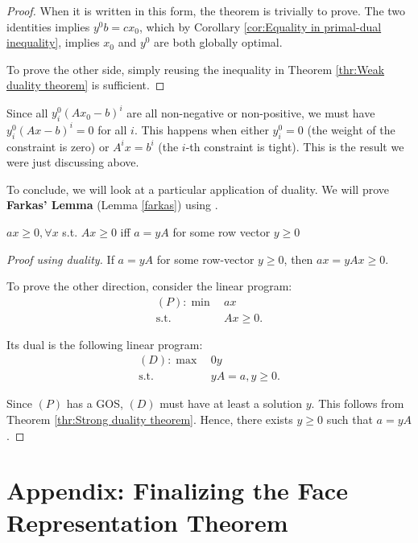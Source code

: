 \begin{proof}
When it is written in this form, the theorem is trivially to prove. The two
identities implies \( y^{0}b = cx_{0} \), which by Corollary \ref{cor:Equality in
primal-dual inequality}, implies \( x_{0} \) and \( y^{0} \) are both globally
optimal.

To prove the other side, simply reusing the inequality in Theorem \ref{thr:Weak
duality theorem} is sufficient.
\end{proof}

Since all \( y_{i}^{0}(Ax_{0}-b)^{i} \) are all non-negative or non-positive,
we must have \( y_{i}^{0}(Ax-b)^{i} = 0 \) for all \( i \). This happens when
either \( y^{0}_{i} = 0 \) (the weight of the constraint is zero) or \( A^{i}x =
b^{i}\) (the \( i \)-th constraint is tight). This is the result we were just
discussing above.

To conclude, we will look at a particular application of duality. We will prove
\textbf{Farkas' Lemma} (Lemma \ref{farkas}) using .

\begin{lemma}
\label{farkas}
  \( ax \ge  0, \forall  x \) s.t. \( Ax \ge  0 \) iff \( a = yA \) for some
  row vector \( y \ge  0 \)
\end{lemma}

\begin{proof}[Proof using duality]
  If \( a = yA \) for some row-vector \( y \ge 0 \), then \( ax = yAx \ge 0 \).

  To prove the other direction, consider the linear program:
  \begin{align*}
    (P): \min\,&ax\\
    \text{s.t.}\,&Ax \ge 0
  .\end{align*}

  Its dual is the following linear program:
  \begin{align*}
    (D): \max\,&0y\\
    \text{s.t.}\,&yA = a, y \ge 0
  .\end{align*}

  Since \( (P) \) has a GOS, \( (D) \) must have at least a solution \( y \).
  This follows from Theorem \ref{thr:Strong duality theorem}.
  Hence, there exists \( y\ge 0 \) such that \( a = yA \).
\end{proof}


\section{Appendix: Finalizing the Face Representation Theorem} %
\label{sec:Appendix: Finalizing the Face Representation Theorem}

